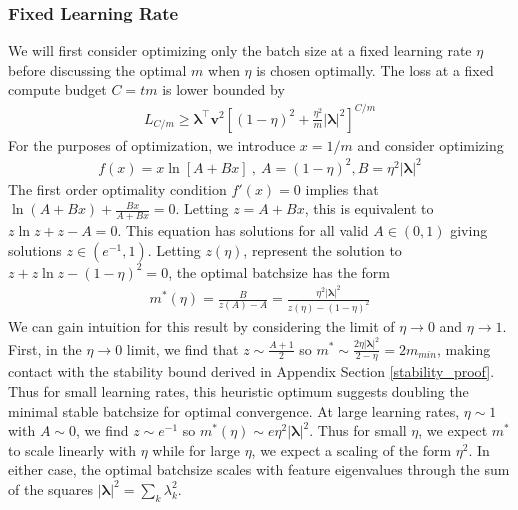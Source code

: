 \documentclass{article} %
\begin{document}
\subsubsection{Fixed Learning Rate}
We will first consider optimizing only the batch size at a fixed learning rate $\eta$ before discussing the optimal $m$ when $\eta$ is chosen optimally.  The loss at a fixed compute budget $C =tm$ is lower bounded by
\begin{align}
    L_{C/m} \geq \bm\lambda^\top \bm v^2 \left[ (1-\eta)^2 + \frac{\eta^2}{m} |\bm\lambda|^2   \right]^{C/m}
\end{align}
For the purposes of optimization, we introduce $x = 1/m$ and consider optimizing
\begin{align}
    f(x) = x \ln\left[ A + B x \right] \ , \ A = (1-\eta)^2 , B = \eta^2 |\bm\lambda|^2
\end{align}
The first order optimality condition $f'(x) = 0$ implies that $\ln(A+Bx) + \frac{Bx}{A+Bx} = 0$. Letting $z = A + Bx$, this is equivalent to $z \ln z + z - A = 0$. This equation has solutions for all valid $A \in (0,1)$ giving solutions $z \in(e^{-1}, 1)$. Letting $z(\eta)$, represent the solution to $z + z\ln z - (1-\eta)^2 = 0$, the optimal batchsize has the form
\begin{align}
 m^*(\eta) = \frac{B}{z(A) -A} = \frac{\eta^2 |\bm\lambda|^2}{z(\eta) - (1-\eta)^2}
\end{align}
We can gain intuition for this result by considering the limit of $\eta \to 0$ and $\eta \to 1$. First, in the $\eta \to 0$ limit, we find that $z \sim \frac{A+1}{2}$ so $m^* \sim \frac{2 \eta |\bm\lambda|^2}{2-\eta} = 2 m_{min}$, making contact with the stability bound derived in Appendix Section \ref{stability_proof}. Thus for small learning rates, this heuristic optimum suggests doubling the minimal stable batchsize for optimal convergence. At large learning rates, $\eta \sim 1$ with $A \sim 0$, we find $z \sim e^{-1}$ so $m^*(\eta) \sim e \eta^2 |\bm\lambda|^2$. Thus for small $\eta$, we expect $m^*$ to scale linearly with $\eta$ while for large $\eta$, we expect a scaling of the form $\eta^2$. In either case, the optimal batchsize scales with feature eigenvalues through the sum of the squares $|\bm\lambda|^2 = \sum_k \lambda_k^2$.
\end{document}
